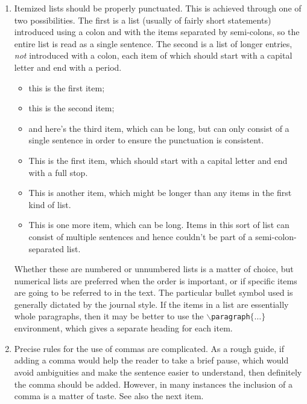 \documentclass[letterpaper,11pt]{article}
\begin{document}
\begin{enumerate}
\item
Itemized lists should be properly punctuated.  This is achieved through one
of two possibilities.  The first is a list (usually of fairly short
statements) introduced using a colon and with the items separated by
semi-colons, so the entire list is read as a single sentence.
The second is a list of longer entries, {\it not\/} introduced
with a colon, each item of which should start with a capital letter and end with
a period.

\smallskip

\begin{itemize}
\item{this is the first item;}

\item{this is the second item;}

\item{and here's the third item, which can be long, but can only consist
of a single sentence in order to ensure the punctuation is consistent.}
\end{itemize}

\begin{itemize}
\item{This is the first item, which should start with a capital letter
 and end with a full stop.}

\item{This is another item, which might be longer than any items in the
 first kind of list.}

\item{This is one more item, which can be long.  Items in this sort of
list can consist of multiple sentences and hence couldn't be part of a
semi-colon-separated list.}
\end{itemize}

\smallskip
\noindent
Whether these are numbered or unnumbered lists is a matter of choice, but numerical lists are preferred when the order is important, or if specific items are going to be referred to in the text.  The particular bullet symbol used is generally dictated by the journal style.  If the items in a list are essentially whole paragraphs, then it may be better to use the {\tt $\backslash$paragraph$\{\dots\}$} environment, which gives a separate heading for each item.

\item Precise rules for the use of commas are complicated.  As a rough 
guide, if adding a comma would help the reader to take a brief pause, which 
would avoid ambiguities and make the sentence easier to understand, then 
definitely the comma should be added.  However, in many instances the 
inclusion of a comma is a matter of taste.  See also the next item.


\end{enumerate}
\end{document}
